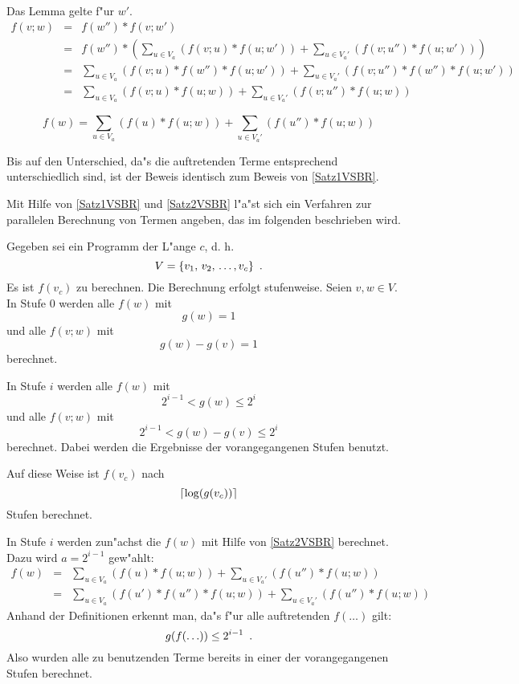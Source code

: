 \begin{beweis}
\begin{MyDescription}
         Das Lemma gelte f"ur $w'$.
         \begin{eqnarray*}
            f(v;w) & = & f(w'') * f(v;w') \\
            & = & f(w'') *
                \left(
                    \sum_{u\in V_a} (f(v;u) * f(u;w')) +
                    \sum_{u\in V_a'} (f(v;u'') * f(u;w'))
                \right) \\
            & = &
                \sum_{u\in V_a} (f(v;u) * f(w'') * f(u;w')) +
                \sum_{u\in V_a'} (f(v;u'') * f(w'') * f(u;w')) \\
            & = &
                \sum_{u\in V_a} (f(v;u) * f(u;w)) +
                \sum_{u\in V_a'} (f(v;u'') * f(u;w))
        \end{eqnarray*}
   \end{MyDescription}
\end{beweis}
  
\begin{lemma}
\label{Satz2VSBR}
    \[
       f(w) = 
           \sum_{u\in V_a} (f(u) * f(u;w)) +
           \sum_{u\in V_a'} (f(u'') * f(u;w))
    \]
\end{lemma}
\begin{beweis}
    Bis auf den Unterschied, da"s die auftretenden Terme entsprechend
    unterschiedlich sind, ist der Beweis identisch zum Beweis von
    \ref{Satz1VSBR}.
\end{beweis}

Mit Hilfe von \ref{Satz1VSBR} und \ref{Satz2VSBR} l"a"st sich ein
Verfahren zur parallelen Berechnung von Termen angeben, das im
folgenden beschrieben wird.

Gegeben sei ein Programm der L"ange $c$,
d. h. \[ V = \{v_1, \, v_2, \, \ldots, v_c\} \mbox{\hspace{0.5em}.} \]
Es ist $f(v_c)$ zu berechnen. Die Berechnung erfolgt stufenweise.
Seien $v,w \in V$.
In Stufe $0$ werden alle $f(w)$ mit \[ g(w)=1 \]  und alle
$f(v;w)$ mit \[ g(w) - g(v) = 1 \] berechnet.

In Stufe $i$ werden alle $f(w)$ mit
\[ 2^{i-1} < g(w) \leq 2^i \] und alle $f(v;w)$ mit
\[ 2^{i-1} < g(w) - g(v) \leq 2^i \] berechnet. Dabei werden die Ergebnisse
der vorangegangenen Stufen benutzt.

Auf diese Weise ist $f(v_c)$ nach
\[ \left\lceil \log(g(v_c)) \right\rceil \] Stufen berechnet.

In Stufe $i$ werden zun"achst die $f(w)$ mit Hilfe von \ref{Satz2VSBR}
berechnet. Dazu wird $a=2^{i-1}$ gew"ahlt:
\begin{eqnarray}
    f(w) \nonumber
    & = & \nonumber
        \sum_{u\in V_a} (f(u) * f(u;w)) +
        \sum_{u\in V_a'} (f(u'') * f(u;w)) \\
    & = & \label{EquStepIfw}
        \sum_{u\in V_a} (f(u')*f(u'')* f(u;w)) +
        \sum_{u\in V_a'} (f(u'') * f(u;w))
\end{eqnarray}
Anhand der Definitionen erkennt man, da"s f"ur alle auftretenden 
$f(\ldots)$ gilt: \[ g(f(\ldots)) \leq 2^{i-1} \mbox{\hspace{0.5em}.} \]
Also wurden alle zu benutzenden Terme bereits in einer der vorangegangenen
Stufen berechnet. 

